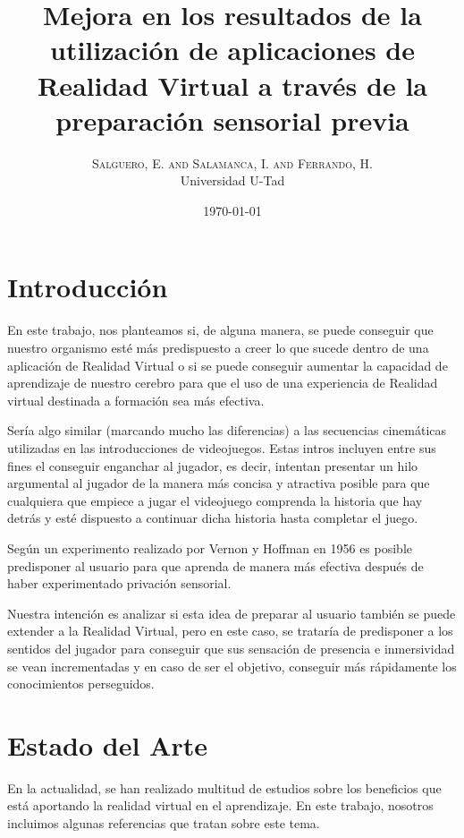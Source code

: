 \documentclass[twoside,twocolumn]{article}
\title{Mejora en los resultados de la utilizaci\'on de aplicaciones de Realidad Virtual a trav\'es de la preparaci\'on sensorial previa} %
\author{%
\textsc{Salguero, E. and Salamanca, I. and Ferrando, H.} \\%
\normalsize Universidad U-Tad \\ %
}
\date{\today} %
\begin{document}
\fancyhead{} %

\maketitle

\section{Introducci\'on}
En este trabajo, nos planteamos si, de alguna manera, se puede conseguir que nuestro organismo est\'e m\'as predispuesto a creer lo que sucede dentro de una aplicaci\'on de Realidad Virtual o si se puede conseguir aumentar la capacidad de aprendizaje de nuestro cerebro para que el uso de una experiencia de Realidad virtual destinada a formaci\'on sea m\'as efectiva.

Ser\'ia algo similar (marcando mucho las diferencias) a las secuencias cinem\'aticas utilizadas en las introducciones de videojuegos. Estas intros incluyen entre sus fines el conseguir enganchar al jugador, es decir, intentan presentar un hilo argumental al jugador de la manera m\'as concisa y atractiva posible para que cualquiera que empiece a jugar el videojuego comprenda la historia que hay detr\'as y est\'e dispuesto a continuar dicha historia hasta completar el juego.

Seg\'un un experimento realizado por Vernon y Hoffman en 1956 \cite{PrivacionSensorial} es posible predisponer al usuario para que aprenda de manera m\'as efectiva despu\'es de haber experimentado privaci\'on sensorial.

Nuestra intenci\'on es analizar si esta idea de preparar al usuario tambi\'en se puede extender a la Realidad Virtual, pero en este caso, se tratar\'ia de predisponer a los sentidos del jugador para conseguir que sus sensaci\'on de presencia e inmersividad se vean incrementadas y en caso de ser el objetivo, conseguir m\'as r\'apidamente los conocimientos perseguidos.


\section{Estado del Arte}
En la actualidad, se han realizado multitud de estudios sobre los beneficios que est\'a aportando la realidad virtual en el aprendizaje. En este trabajo, nosotros incluimos  algunas referencias que tratan sobre este tema.
\end{document}

